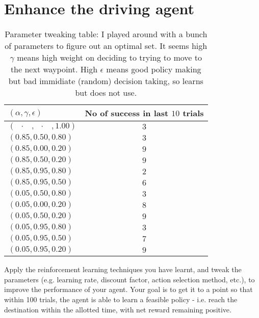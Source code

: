 \documentclass{article}
\begin{document}
\section{Enhance the driving agent}


\begin{table}
  \begin{center}
    \begin{tabular}{ | l | c | }
      \hline
      $(\alpha,\gamma,\epsilon)$ & No of success in last $10$ trials \\ \hline\hline
      $(\;\;\cdot\;\;\;,\;\;\cdot\;\;\;,1.00)$ & $3$ \\ \hline 
      $(0.85,0.50,0.80)$ & $3$ \\ \hline 
      $(0.85,0.00,0.20)$ & $9$ \\ \hline 
      $(0.85,0.50,0.20)$ & $9$ \\ \hline 
      $(0.85,0.95,0.80)$ & $2$ \\ \hline 
      $(0.85,0.95,0.50)$ & $6$ \\ \hline      
      $(0.05,0.50,0.80)$ & $3$ \\ \hline 
      $(0.05,0.00,0.20)$ & $8$ \\ \hline 
      $(0.05,0.50,0.20)$ & $9$ \\ \hline 
      $(0.05,0.95,0.80)$ & $3$ \\ \hline 
      $(0.05,0.95,0.50)$ & $7$ \\ \hline 
      $(0.05,0.95,0.20)$ & $9$ \\
    \hline
    \end{tabular}
   \end{center}
  \caption{Parameter tweaking table: I played around with a bunch of parameters to figure out an optimal set. It seems high $\gamma$ means high weight on deciding to trying to move to the next waypoint. High $\epsilon$ means good policy making but bad immidiate (random) decision taking, so learns but does not use.}
\end{table}




Apply the reinforcement learning techniques you have learnt, and tweak the parameters (e.g. learning rate, discount factor, action selection method, etc.), to improve the performance of your agent. Your goal is to get it to a point so that within 100 trials, the agent is able to learn a feasible policy - i.e. reach the destination within the allotted time, with net reward remaining positive.


\vspace{.5cm}
\end{document}
